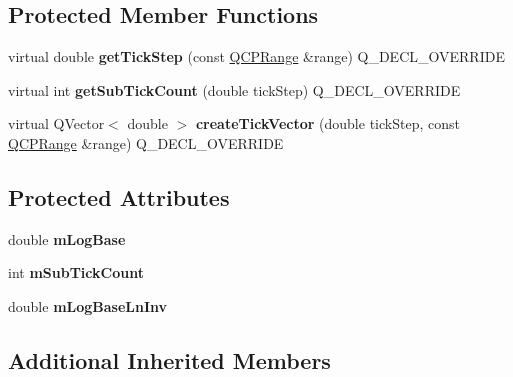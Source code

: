 \subsection*{Protected Member Functions}
\begin{DoxyCompactItemize}
\item 
\mbox{\label{class_q_c_p_axis_ticker_log_a57be974214a065d3247406331f02fa49}} 
virtual double {\bfseries get\+Tick\+Step} (const \hyperlink{class_q_c_p_range}{Q\+C\+P\+Range} \&range) Q\+\_\+\+D\+E\+C\+L\+\_\+\+O\+V\+E\+R\+R\+I\+DE
\item 
\mbox{\label{class_q_c_p_axis_ticker_log_a352fef7ae68837acd26e35188aa86167}} 
virtual int {\bfseries get\+Sub\+Tick\+Count} (double tick\+Step) Q\+\_\+\+D\+E\+C\+L\+\_\+\+O\+V\+E\+R\+R\+I\+DE
\item 
\mbox{\label{class_q_c_p_axis_ticker_log_af8873a8d1d2b9392d8f7a73218c889ab}} 
virtual Q\+Vector$<$ double $>$ {\bfseries create\+Tick\+Vector} (double tick\+Step, const \hyperlink{class_q_c_p_range}{Q\+C\+P\+Range} \&range) Q\+\_\+\+D\+E\+C\+L\+\_\+\+O\+V\+E\+R\+R\+I\+DE
\end{DoxyCompactItemize}
\subsection*{Protected Attributes}
\begin{DoxyCompactItemize}
\item 
\mbox{\label{class_q_c_p_axis_ticker_log_a4108bcc1cd68dcec54dc75667440d328}} 
double {\bfseries m\+Log\+Base}
\item 
\mbox{\label{class_q_c_p_axis_ticker_log_a3d92b729bedbbbd34ee5f74565defd95}} 
int {\bfseries m\+Sub\+Tick\+Count}
\item 
\mbox{\label{class_q_c_p_axis_ticker_log_aeba719bbeec39957f475ef89d6ae2fe7}} 
double {\bfseries m\+Log\+Base\+Ln\+Inv}
\end{DoxyCompactItemize}
\subsection*{Additional Inherited Members}


